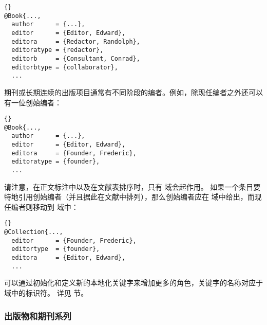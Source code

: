 \begin{lstlisting}[style=bibtex]{}
@Book{...,
  author      = {...},
  editor      = {Editor, Edward},
  editora     = {Redactor, Randolph},
  editoratype = {redactor},
  editorb     = {Consultant, Conrad},
  editorbtype = {collaborator},
  ...
\end{lstlisting}
%
期刊或长期连续的出版项目通常有不同阶段的编者。例如，除现任编者之外还可以有一位创始编者：

\begin{lstlisting}[style=bibtex]{}
@Book{...,
  author      = {...},
  editor      = {Editor, Edward},
  editora     = {Founder, Frederic},
  editoratype = {founder},
  ...
\end{lstlisting}
%
请注意，在正文标注中以及在文献表排序时，只有  域会起作用。
如果一个条目要特地引用创始编者（并且据此在文献中排列），那么创始编者应在  域中给出，而现任编者则移动到  域中：

\begin{lstlisting}[style=bibtex]{}
@Collection{...,
  editor      = {Founder, Frederic},
  editortype  = {founder},
  editora     = {Editor, Edward},
  ...
\end{lstlisting}
%
可以通过初始化和定义新的本地化关键字来增加更多的角色，关键字的名称对应于  域中的标识符。
详见  节。

\subsubsection{出版物和期刊系列}%
\label{bib:use:ser}

